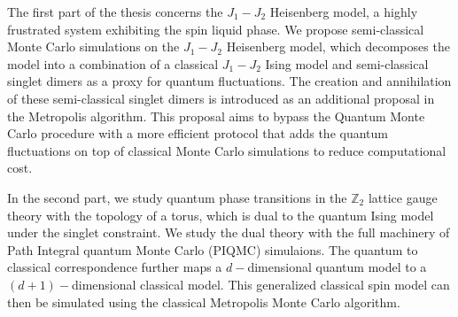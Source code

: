 \documentclass[a4paper,12pt]{report}
\numberwithin{equation}{section}
\begin{document}
The first part of the thesis concerns the $J_1 - J_2$ Heisenberg model, a highly frustrated system exhibiting the spin liquid phase. We propose semi-classical Monte Carlo simulations on the $J_1 - J_2$ Heisenberg model, which decomposes the model into a combination of a classical $J_1 - J_2$ Ising model and semi-classical singlet dimers as a proxy for quantum fluctuations. The creation and annihilation of these semi-classical singlet dimers is introduced as an additional proposal in the Metropolis algorithm. This proposal aims to bypass the Quantum Monte Carlo procedure with a more efficient protocol that adds the quantum fluctuations on top of classical Monte Carlo simulations to reduce computational cost.

In the second part, we study quantum phase transitions in the $\mathbb{Z}_2$ lattice gauge theory with the topology of a torus, which is dual to the quantum Ising model under the singlet constraint. We study the dual theory with the full machinery of Path Integral quantum Monte Carlo (PIQMC) simulaions. The quantum to classical correspondence further maps a $d-$dimensional quantum model to a $(d+1)-$dimensional classical model. This generalized classical spin model can then be simulated using the classical Metropolis Monte Carlo algorithm.

\newpage
\thispagestyle{empty}
\mbox{}
\newpage

\restoregeometry

\listoffigures

\newpage

\tableofcontents
{} 
\newpage

\newpage
\newpage
\newpage
\newpage
\printbibliography[
heading=bibintoc,
title={References}
]
\end{document}

